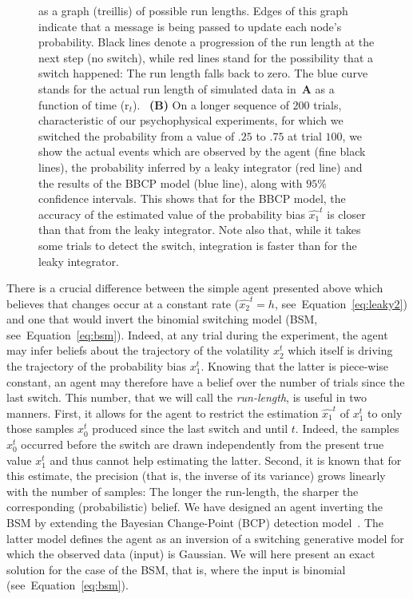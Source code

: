 \documentclass[12pt,english]{article}%
\newcommand{\citep}[1]{\parencite{#1}}
\newcommand{\seeEq}[1]{Equation~\ref{eq:#1}}
\begin{document}
\begin{figure}
{as a graph (treillis) of possible run lengths.
Edges of this graph indicate that a message is being passed
to update each node's probability.
Black lines denote a progression of the run length at the next step (no switch),
while red lines stand for the possibility that a switch happened:
The run length falls back to zero.
The blue curve stands for
the actual run length of simulated data in~\textbf{A}
as a function of time (r$_t$).
~\textbf{(B)} On a longer sequence of $200$ trials,
characteristic of our psychophysical experiments,
for which we switched the probability from a value of $.25$ to $.75$ at trial $100$,
we show
the actual events which are observed by the agent (fine black lines),
the probability inferred by a leaky integrator (red line)
and the results of the BBCP model (blue line),
along with $95\%$ confidence intervals.
This shows that for the BBCP model,
the accuracy of the estimated value of the probability bias $\hat{x_1}^t$
is closer than that from the leaky integrator.
Note also that, while it takes some trials to detect the switch,
integration is faster than for the leaky integrator.
}
\label{fig:bayesianchangepoint}
\end{figure}
There is a crucial difference between the simple agent presented above
which believes that changes occur at a constant rate ($\hat{x_2}^t=h$, see~\seeEq{leaky2})
and one that would invert the binomial switching model (BSM, see~\seeEq{bsm}).
Indeed, at any trial during the experiment,
the agent may infer beliefs about the trajectory of the volatility $x_2^t$
which itself is driving the trajectory of the probability bias $x_1^t$.
Knowing that the latter is piece-wise constant,
an agent may therefore have a belief over the number of trials since the last switch.
This number, that we will call the \emph{run-length}, is useful in two manners.
First, it allows for the agent to restrict the estimation $\hat{x_1}^{t}$ of $x_1^t$
to only those samples $x_0^t$ produced since the last switch and until $t$.
Indeed, the samples $x_0^t$ occurred before the switch are drawn independently from the present true value $x_1^t$
and thus cannot help estimating the latter.
Second, it is known that for this estimate, the precision
(that is, the inverse of its variance)
grows linearly with the number of samples:
The longer the run-length, the sharper the corresponding (probabilistic) belief.
We have designed an agent inverting the BSM by extending
the Bayesian Change-Point (BCP) detection model~\citep{AdamsMackay2007}.
The latter model defines the agent as an inversion of a switching generative model
for which the observed data (input) is Gaussian.
We will here present an exact solution for the case of the BSM,
that is, where the input is binomial (see~\seeEq{bsm}).
\end{document}
